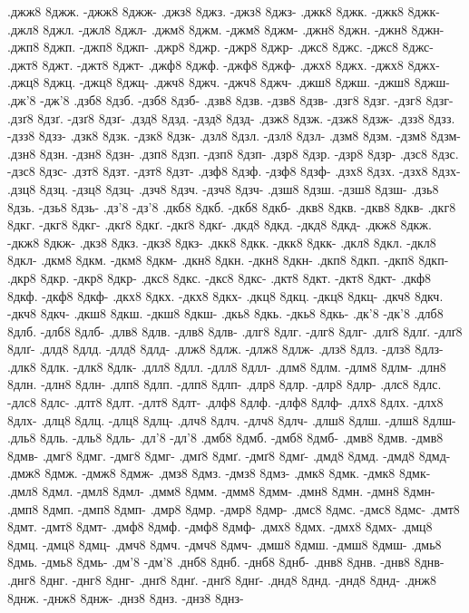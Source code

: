 {.джж8 8джж. -джж8 8джж-
.джз8 8джз. -джз8 8джз-
.джк8 8джк. -джк8 8джк-
.джл8 8джл. -джл8 8джл-
.джм8 8джм. -джм8 8джм-
.джн8 8джн. -джн8 8джн-
.джп8 8джп. -джп8 8джп-
.джр8 8джр. -джр8 8джр-
.джс8 8джс. -джс8 8джс-
.джт8 8джт. -джт8 8джт-
.джф8 8джф. -джф8 8джф-
.джх8 8джх. -джх8 8джх-
.джц8 8джц. -джц8 8джц-
.джч8 8джч. -джч8 8джч-
.джш8 8джш. -джш8 8джш-
.дж'8 -дж'8
.дзб8 8дзб. -дзб8 8дзб-
.дзв8 8дзв. -дзв8 8дзв-
.дзг8 8дзг. -дзг8 8дзг-
.дзґ8 8дзґ. -дзґ8 8дзґ-
.дзд8 8дзд. -дзд8 8дзд-
.дзж8 8дзж. -дзж8 8дзж-
.дзз8 8дзз. -дзз8 8дзз-
.дзк8 8дзк. -дзк8 8дзк-
.дзл8 8дзл. -дзл8 8дзл-
.дзм8 8дзм. -дзм8 8дзм-
.дзн8 8дзн. -дзн8 8дзн-
.дзп8 8дзп. -дзп8 8дзп-
.дзр8 8дзр. -дзр8 8дзр-
.дзс8 8дзс. -дзс8 8дзс-
.дзт8 8дзт. -дзт8 8дзт-
.дзф8 8дзф. -дзф8 8дзф-
.дзх8 8дзх. -дзх8 8дзх-
.дзц8 8дзц. -дзц8 8дзц-
.дзч8 8дзч. -дзч8 8дзч-
.дзш8 8дзш. -дзш8 8дзш-
.дзь8 8дзь. -дзь8 8дзь-
.дз'8 -дз'8
.дкб8 8дкб. -дкб8 8дкб-
.дкв8 8дкв. -дкв8 8дкв-
.дкг8 8дкг. -дкг8 8дкг-
.дкґ8 8дкґ. -дкґ8 8дкґ-
.дкд8 8дкд. -дкд8 8дкд-
.дкж8 8дкж. -дкж8 8дкж-
.дкз8 8дкз. -дкз8 8дкз-
.дкк8 8дкк. -дкк8 8дкк-
.дкл8 8дкл. -дкл8 8дкл-
.дкм8 8дкм. -дкм8 8дкм-
.дкн8 8дкн. -дкн8 8дкн-
.дкп8 8дкп. -дкп8 8дкп-
.дкр8 8дкр. -дкр8 8дкр-
.дкс8 8дкс. -дкс8 8дкс-
.дкт8 8дкт. -дкт8 8дкт-
.дкф8 8дкф. -дкф8 8дкф-
.дкх8 8дкх. -дкх8 8дкх-
.дкц8 8дкц. -дкц8 8дкц-
.дкч8 8дкч. -дкч8 8дкч-
.дкш8 8дкш. -дкш8 8дкш-
.дкь8 8дкь. -дкь8 8дкь-
.дк'8 -дк'8
.длб8 8длб. -длб8 8длб-
.длв8 8длв. -длв8 8длв-
.длг8 8длг. -длг8 8длг-
.длґ8 8длґ. -длґ8 8длґ-
.длд8 8длд. -длд8 8длд-
.длж8 8длж. -длж8 8длж-
.длз8 8длз. -длз8 8длз-
.длк8 8длк. -длк8 8длк-
.длл8 8длл. -длл8 8длл-
.длм8 8длм. -длм8 8длм-
.длн8 8длн. -длн8 8длн-
.длп8 8длп. -длп8 8длп-
.длр8 8длр. -длр8 8длр-
.длс8 8длс. -длс8 8длс-
.длт8 8длт. -длт8 8длт-
.длф8 8длф. -длф8 8длф-
.длх8 8длх. -длх8 8длх-
.длц8 8длц. -длц8 8длц-
.длч8 8длч. -длч8 8длч-
.длш8 8длш. -длш8 8длш-
.дль8 8дль. -дль8 8дль-
.дл'8 -дл'8
.дмб8 8дмб. -дмб8 8дмб-
.дмв8 8дмв. -дмв8 8дмв-
.дмг8 8дмг. -дмг8 8дмг-
.дмґ8 8дмґ. -дмґ8 8дмґ-
.дмд8 8дмд. -дмд8 8дмд-
.дмж8 8дмж. -дмж8 8дмж-
.дмз8 8дмз. -дмз8 8дмз-
.дмк8 8дмк. -дмк8 8дмк-
.дмл8 8дмл. -дмл8 8дмл-
.дмм8 8дмм. -дмм8 8дмм-
.дмн8 8дмн. -дмн8 8дмн-
.дмп8 8дмп. -дмп8 8дмп-
.дмр8 8дмр. -дмр8 8дмр-
.дмс8 8дмс. -дмс8 8дмс-
.дмт8 8дмт. -дмт8 8дмт-
.дмф8 8дмф. -дмф8 8дмф-
.дмх8 8дмх. -дмх8 8дмх-
.дмц8 8дмц. -дмц8 8дмц-
.дмч8 8дмч. -дмч8 8дмч-
.дмш8 8дмш. -дмш8 8дмш-
.дмь8 8дмь. -дмь8 8дмь-
.дм'8 -дм'8
.днб8 8днб. -днб8 8днб-
.днв8 8днв. -днв8 8днв-
.днг8 8днг. -днг8 8днг-
.днґ8 8днґ. -днґ8 8днґ-
.днд8 8днд. -днд8 8днд-
.днж8 8днж. -днж8 8днж-
.днз8 8днз. -днз8 8днз-
}
